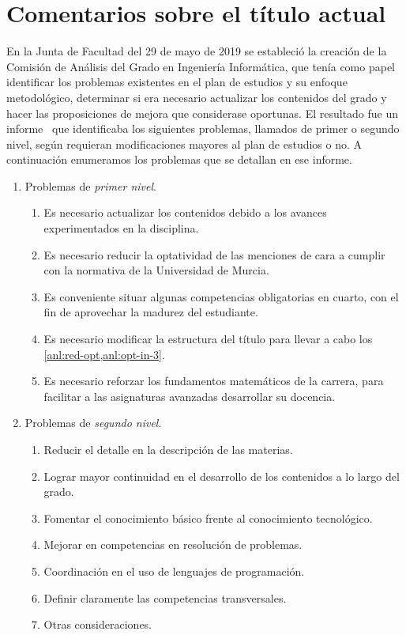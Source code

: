 \chapter{Comentarios sobre el título actual}\label{chap:analysis}


En la Junta de Facultad del 29 de mayo de 2019
se estableció la creación de
la Comisión de Análisis del Grado en Ingeniería Informática,
que tenía como papel
identificar los problemas existentes en
el plan de estudios y su enfoque metodológico,
determinar si era necesario actualizar los contenidos del grado y
hacer las proposiciones de mejora que considerase oportunas.
El resultado fue un informe~\cite{analysis-comission}
que identificaba los siguientes problemas,
llamados de primer o segundo nivel,
según requieran modificaciones mayores al plan de estudios o no.
A continuación enumeramos los problemas que se detallan en ese informe.

\begin{enumerate}
    \item Problemas de \emph{primer nivel}.
    \begin{enumerate}
        \item Es necesario actualizar los contenidos
        debido a los avances experimentados en la disciplina.
        \item\label{anl:red-opt}
        Es necesario reducir la optatividad de las menciones de cara a
        cumplir con la normativa de la Universidad de Murcia.
        \item\label{anl:opt-in-3}
        Es conveniente situar algunas competencias obligatorias en cuarto,
        con el fin de aprovechar la madurez del estudiante.
        \item Es necesario modificar la estructura del título
        para llevar a cabo los \cref{anl:red-opt,anl:opt-in-3}.
        \item Es necesario reforzar los fundamentos matemáticos de la carrera,
        para facilitar a las asignaturas avanzadas desarrollar su docencia.
    \end{enumerate}

    \item Problemas de \emph{segundo nivel}.
    \begin{enumerate}
        \item Reducir el detalle en la descripción de las materias.
        \item Lograr mayor continuidad en el desarrollo de los contenidos
        a lo largo del grado.
        \item Fomentar el conocimiento básico
        frente al conocimiento tecnológico.
        \item Mejorar en competencias en resolución de problemas.
        \item Coordinación en el uso de lenguajes de programación.
        \item Definir claramente las competencias transversales.
        \item Otras consideraciones.
    \end{enumerate}
\end{enumerate}


